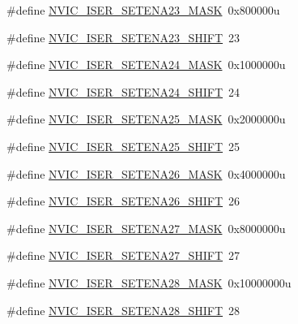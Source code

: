 \begin{DoxyCompactItemize}
\item 
\#define \hyperlink{group___n_v_i_c___register___masks_ga865d83bfaf691707aa4018f70a180919}{N\+V\+I\+C\+\_\+\+I\+S\+E\+R\+\_\+\+S\+E\+T\+E\+N\+A23\+\_\+\+M\+A\+SK}~0x800000u
\item 
\#define \hyperlink{group___n_v_i_c___register___masks_ga7a35c2c41016457dafda0bfdfcc5c149}{N\+V\+I\+C\+\_\+\+I\+S\+E\+R\+\_\+\+S\+E\+T\+E\+N\+A23\+\_\+\+S\+H\+I\+FT}~23
\item 
\#define \hyperlink{group___n_v_i_c___register___masks_ga6e10a9dbee7fc4051eb5f0b8317611d7}{N\+V\+I\+C\+\_\+\+I\+S\+E\+R\+\_\+\+S\+E\+T\+E\+N\+A24\+\_\+\+M\+A\+SK}~0x1000000u
\item 
\#define \hyperlink{group___n_v_i_c___register___masks_ga106d969fd6843d8ae2dfe751d16a3d72}{N\+V\+I\+C\+\_\+\+I\+S\+E\+R\+\_\+\+S\+E\+T\+E\+N\+A24\+\_\+\+S\+H\+I\+FT}~24
\item 
\#define \hyperlink{group___n_v_i_c___register___masks_ga5d6ca84f80d550aa2d971d5b51d8ec27}{N\+V\+I\+C\+\_\+\+I\+S\+E\+R\+\_\+\+S\+E\+T\+E\+N\+A25\+\_\+\+M\+A\+SK}~0x2000000u
\item 
\#define \hyperlink{group___n_v_i_c___register___masks_ga016646dc14d1f852609489fffd6f93b9}{N\+V\+I\+C\+\_\+\+I\+S\+E\+R\+\_\+\+S\+E\+T\+E\+N\+A25\+\_\+\+S\+H\+I\+FT}~25
\item 
\#define \hyperlink{group___n_v_i_c___register___masks_ga64bbbbb044f5d81c276ebbbbee79d51f}{N\+V\+I\+C\+\_\+\+I\+S\+E\+R\+\_\+\+S\+E\+T\+E\+N\+A26\+\_\+\+M\+A\+SK}~0x4000000u
\item 
\#define \hyperlink{group___n_v_i_c___register___masks_ga51b3ebd0bd266f814a828793c574fe4f}{N\+V\+I\+C\+\_\+\+I\+S\+E\+R\+\_\+\+S\+E\+T\+E\+N\+A26\+\_\+\+S\+H\+I\+FT}~26
\item 
\#define \hyperlink{group___n_v_i_c___register___masks_ga415b92745cfbf6d8fd2f34c87000ae98}{N\+V\+I\+C\+\_\+\+I\+S\+E\+R\+\_\+\+S\+E\+T\+E\+N\+A27\+\_\+\+M\+A\+SK}~0x8000000u
\item 
\#define \hyperlink{group___n_v_i_c___register___masks_ga5fbe6d73817104eef58e4e35e76b72a6}{N\+V\+I\+C\+\_\+\+I\+S\+E\+R\+\_\+\+S\+E\+T\+E\+N\+A27\+\_\+\+S\+H\+I\+FT}~27
\item 
\#define \hyperlink{group___n_v_i_c___register___masks_ga9acc82ab89ec65c9e8b719c6eab643bf}{N\+V\+I\+C\+\_\+\+I\+S\+E\+R\+\_\+\+S\+E\+T\+E\+N\+A28\+\_\+\+M\+A\+SK}~0x10000000u
\item 
\#define \hyperlink{group___n_v_i_c___register___masks_ga8a7ab7951dbcd9b2cf043c7df6caede0}{N\+V\+I\+C\+\_\+\+I\+S\+E\+R\+\_\+\+S\+E\+T\+E\+N\+A28\+\_\+\+S\+H\+I\+FT}~28

\end{DoxyCompactItemize}
